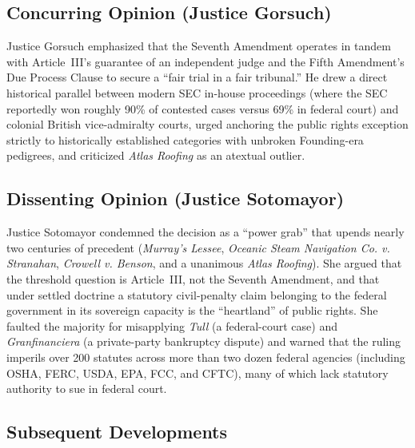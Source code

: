 \documentclass[12pt]{article}
\begin{document}
\subsection{Concurring Opinion (Justice Gorsuch)}

Justice Gorsuch emphasized that the Seventh Amendment operates in tandem with Article~III's guarantee of an independent judge and the Fifth Amendment's Due Process Clause to secure a ``fair trial in a fair tribunal.'' He drew a direct historical parallel between modern SEC in-house proceedings (where the SEC reportedly won roughly 90\% of contested cases versus 69\% in federal court) and colonial British vice-admiralty courts, urged anchoring the public rights exception strictly to historically established categories with unbroken Founding-era pedigrees, and criticized \textit{Atlas Roofing} as an atextual outlier.

\subsection{Dissenting Opinion (Justice Sotomayor)}

Justice Sotomayor condemned the decision as a ``power grab'' that upends nearly two centuries of precedent (\textit{Murray's Lessee}, \textit{Oceanic Steam Navigation Co. v. Stranahan}, \textit{Crowell v. Benson}, and a unanimous \textit{Atlas Roofing}). She argued that the threshold question is Article~III, not the Seventh Amendment, and that under settled doctrine a statutory civil-penalty claim belonging to the federal government in its sovereign capacity is the ``heartland'' of public rights. She faulted the majority for misapplying \textit{Tull} (a federal-court case) and \textit{Granfinanciera} (a private-party bankruptcy dispute) and warned that the ruling imperils over 200 statutes across more than two dozen federal agencies (including OSHA, FERC, USDA, EPA, FCC, and CFTC), many of which lack statutory authority to sue in federal court.

\subsection{Subsequent Developments}
\end{document}
